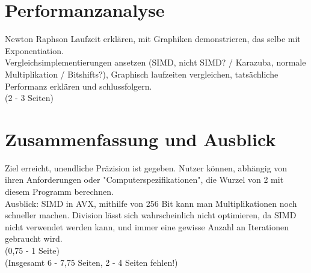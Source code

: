 \documentclass[course=erap]{aspdoc}
\begin{document}
\section{Performanzanalyse} \label{sec:performanz}
Newton Raphson Laufzeit erklären, mit Graphiken demonstrieren, das selbe mit Exponentiation. \\
Vergleichsimplementierungen ansetzen (SIMD, nicht SIMD? / Karazuba, normale Multiplikation / Bitshifts?), Graphisch laufzeiten vergleichen, tatsächliche Performanz erklären und schlussfolgern. \\
(2 - 3 Seiten)

\section{Zusammenfassung und Ausblick} \label{sec:zusammenfassung}
Ziel erreicht, unendliche Präzision ist gegeben. Nutzer können, abhängig von ihren Anforderungen oder "Computerspezifikationen", die Wurzel von 2 mit diesem Programm berechnen. \\
Ausblick: SIMD in AVX, mithilfe von 256 Bit kann man Multiplikationen noch schneller machen. Division lässt sich wahrscheinlich nicht optimieren, da SIMD nicht verwendet werden kann, 
und immer eine gewisse Anzahl an Iterationen gebraucht wird. \\
(0,75 - 1 Seite) \\
(Insgesamt 6 - 7,75 Seiten, 2 - 4 Seiten fehlen!)


{}
\end{document}
